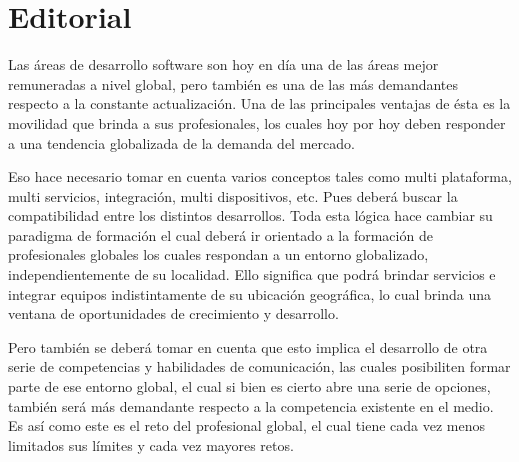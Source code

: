 \documentclass[12pt,spanish,Letterpaper,openany]{book}
\makeatletter
\renewcommand\frontmatter{\clearpage\@mainmatterfalse\pagenumbering{roman}}
\newcommand{\spacetwomilis}{\vspace{2mm}}
\newcommand{\spaceinitialeditorialcontenido}{\vspace{11.1mm}}
\newcommand{\labelchapter}{\empty}
\newcommand{\noformatchapter}{\normalfont\bfseries}
\newcommand{\nolabelchapter}{\labelchapter}
\newcommand{\nosepchapter}{0pt}
\newcommand{\nobeforecodechapter}{\Huge}
\makeatother
\begin{document}

\frontmatter

\titleformat{\chapter}[display]{\noformatchapter}{\nolabelchapter}{\nosepchapter}{\nobeforecodechapter}

\hypertarget{editorial}{%
\chapter*{Editorial}\label{editorial}}

\spaceinitialeditorialcontenido

Las áreas de desarrollo software son hoy en día una de las áreas mejor remuneradas a nivel global, pero también es una de las más demandantes respecto a la constante actualización. Una de las principales ventajas de ésta es la movilidad que brinda a sus profesionales, los cuales hoy por hoy deben responder a una tendencia globalizada de la demanda del mercado.

Eso hace necesario tomar en cuenta varios conceptos tales como multi plataforma, multi servicios, integración, multi dispositivos, etc. Pues deberá buscar la compatibilidad entre los distintos desarrollos. Toda esta lógica hace cambiar su paradigma de formación el cual deberá ir orientado a la formación de profesionales globales los cuales respondan a un entorno globalizado, independientemente de su localidad. Ello significa que podrá brindar servicios e integrar equipos indistintamente de su ubicación geográfica, lo cual brinda una ventana de oportunidades de crecimiento y desarrollo.

Pero también se deberá tomar en cuenta que esto implica el desarrollo de otra serie de competencias y habilidades de comunicación, las cuales posibiliten formar parte de ese entorno global, el cual si bien es cierto abre una serie de opciones, también será más demandante respecto a la competencia existente en el medio.
Es así como este es el reto del profesional global, el cual tiene cada vez menos limitados sus límites y cada vez mayores retos.

\spacetwomilis
\spacetwomilis
\spacetwomilis
\end{document}
